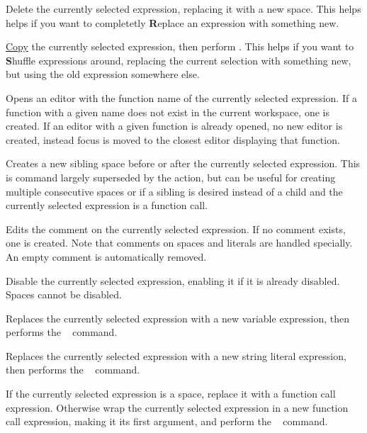 Delete the currently selected expression, replacing it with a new space. This
helps helps if you want to completetly \textbf{R}eplace an expression with
something new.

\hyperref[cmd:copy]{Copy} the currently selected expression, then perform
\hyperref[cmd:delete_blank]{}. This helps if you want
to \textbf{S}huffle expressions around, replacing the current selection with
something new, but using the old expression somewhere else.

Opens an editor with the function name of the currently selected expression.
If a function with a given name does not exist in the current workspace, one is
created.
If an editor with a given function is already opened, no new editor is created,
instead focus is moved to the closest editor displaying that function.


Creates a new sibling space before or after the currently selected
expression. This is command largely superseded by the
\hyperref[cmd:smart_space]{} \keys{\SPACE} action, but can be
useful for creating multiple consecutive spaces or if a sibling is desired
instead of a child and the currently selected expression is a function call.

Edits the comment on the currently selected expression. If no comment exists,
one is created. Note that comments on spaces and literals are handled
specially. An empty comment is automatically removed.

Disable the currently selected expression, enabling it if it is already
disabled. Spaces cannot be disabled.

Replaces the currently selected expression with a new variable expression, then
performs the \hyperref[cmd:edit]{}~\keys{\return} command.

Replaces the currently selected expression with a new string literal
expression, then
performs the \hyperref[cmd:edit]{}~\keys{\return} command.

If the currently selected expression is a space, replace it with a function
call expression. Otherwise wrap the currently selected expression in a new
function call expression, making it its first argument, and perform
the \hyperref[cmd:edit]{}~\keys{\return} command.

